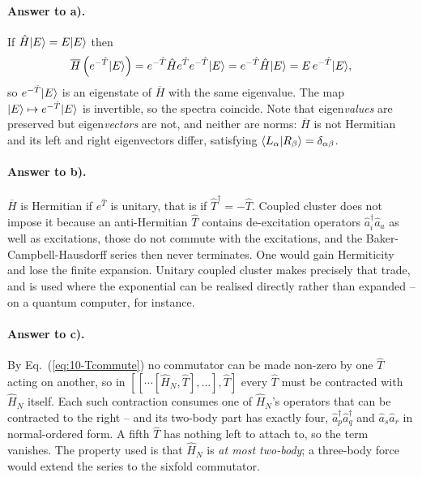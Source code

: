 \paragraph{Answer to a).}
If $\hat{H}\vert E \rangle=E\vert E \rangle$ then
\begin{equation}
  \overline{H}\left(e^{-\hat{T}}\vert E \rangle\right)
   = e^{-\hat{T}}\hat{H}e^{\hat{T}}e^{-\hat{T}}\vert E \rangle
   = e^{-\hat{T}}\hat{H}\vert E \rangle
   = E\,e^{-\hat{T}}\vert E \rangle,
  \label{eq:10-exa2}
\end{equation}
so $e^{-\hat{T}}\vert E \rangle$ is an eigenstate of $\overline{H}$ with the same
eigenvalue.  The map $\vert E \rangle\mapsto e^{-\hat{T}}\vert E \rangle$ is invertible, so
the spectra coincide.  Note that eigen\emph{values} are preserved but
eigen\emph{vectors} are not, and neither are norms: $\overline{H}$ is not
Hermitian and its left and right eigenvectors differ, satisfying
$\langle L_\alpha \vert R_\beta \rangle=\delta_{\alpha\beta}$.

\paragraph{Answer to b).}
$\overline{H}$ is Hermitian if $e^{\hat{T}}$ is unitary, that is if
$\hat{T}^{\dagger}=-\hat{T}$.  Coupled cluster does not impose it because an
anti-Hermitian $\hat{T}$ contains de-excitation operators
$\hat{a}^{\dagger}_i\hat{a}_a$ as well as excitations, those do not commute
with the excitations, and the Baker-Campbell-Hausdorff series then never
terminates.  One would gain Hermiticity and lose the finite expansion.
Unitary coupled cluster makes precisely that trade, and is used where the
exponential can be realised directly rather than expanded -- on a quantum
computer, for instance.

\paragraph{Answer to c).}
By Eq.~(\ref{eq:10-Tcommute}) no commutator can be made non-zero by one
$\hat{T}$ acting on another, so in
$[[\cdots[\hat{H}_N,\hat{T}],\ldots],\hat{T}]$ every $\hat{T}$ must be
contracted with $\hat{H}_N$ itself.  Each such contraction consumes one of
$\hat{H}_N$'s operators that can be contracted to the right -- and its
two-body part has exactly four, $\hat{a}^{\dagger}_p\hat{a}^{\dagger}_q$ and
$\hat{a}_s\hat{a}_r$ in normal-ordered form.  A fifth $\hat{T}$ has nothing
left to attach to, so the term vanishes.  The property used is that
$\hat{H}_N$ is \emph{at most two-body}; a three-body force would extend the
series to the sixfold commutator.

